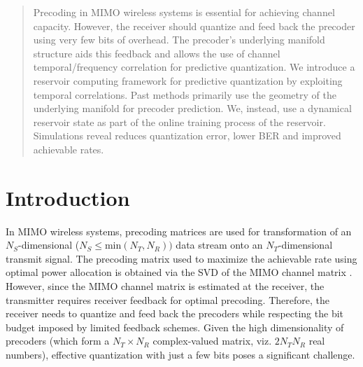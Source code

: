 \documentclass[conference]{IEEEtran}
\begin{document}
\begin{abstract}


  Precoding in MIMO wireless systems is essential for achieving
  channel capacity. However, the receiver should quantize and feed
  back the precoder using very few bits of overhead. The precoder's
  underlying manifold structure aids this feedback and allows the use
  of channel temporal/frequency correlation for predictive
  quantization. We introduce a reservoir computing framework for
  predictive quantization by exploiting temporal correlations. Past
  methods primarily use the geometry of the underlying manifold for
  precoder prediction.  We, instead, use a dynamical reservoir state
  as part of the online training process of the reservoir.
  Simulations reveal reduces quantization error, lower BER and
  improved achievable rates.
\end{abstract}


\vspace{-5pt}
\section{Introduction}
\vspace{-5pt}
\label{intro}
In MIMO wireless systems, precoding matrices are used for transformation of an $N_S$-dimensional ($N_S \leq \text{min}(N_T,N_R))$ data stream onto an $N_T$-dimensional transmit signal.
The precoding matrix used to maximize the achievable rate using optimal power allocation is obtained via the SVD of the MIMO channel matrix \cite{love2008overview}.
However, since the MIMO channel matrix is estimated at the receiver, the transmitter requires receiver feedback for optimal precoding.
Therefore, the receiver needs to quantize and feed back the precoders while respecting the bit budget imposed by limited feedback schemes.
Given the high dimensionality of precoders (which form a $N_T \times N_R$ complex-valued matrix, viz. $2N_TN_R$ real numbers), effective quantization with just a few bits poses a significant challenge.
\end{document}
